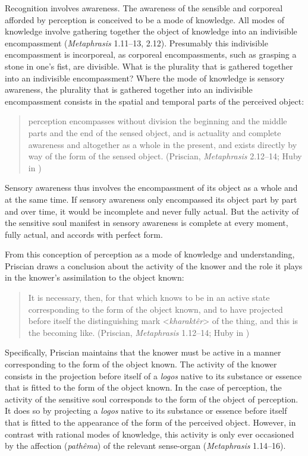 \documentclass[12pt]{article}
\begin{document}
Recognition involves awareness. The awareness of the sensible and corporeal afforded by perception is conceived to be a mode of knowledge. All modes of knowledge involve gathering together the object of knowledge into an indivisible encompassment (\emph{Metaphrasis} 1.11--13, 2.12). Presumably this indivisible encompassment is incorporeal, as corporeal encompassments, such as grasping a stone in one's fist, are divisible. What is the plurality that is gathered together into an indivisible encompassment? Where the mode of knowledge is sensory awareness, the plurality that is gathered together into an indivisible encompassment consists in the spatial and temporal parts of the perceived object:
\begin{quote}
	perception encompasses without division the beginning and the middle parts and the end of the sensed object, and is actuality and complete awareness and altogether as a whole in the present, and exists directly by way of the form of the sensed object. (Priscian, \emph{Metaphrasis} 2.12--14; Huby in \citealt{Sorabji:1997ly})
\end{quote}
Sensory awareness thus involves the encompassment of its object as a whole and at the same time. If sensory awareness only encompassed its object part by part and over time, it would be incomplete and never fully actual. But the activity of the sensitive soul manifest in sensory awareness is complete at every moment, fully actual, and accords with perfect form.

From this conception of perception as a mode of knowledge and understanding, Priscian draws a conclusion about the activity of the knower and the role it plays in the knower's assimilation to the object known: 
\begin{quote}
	It is necessary, then, for that which knows to be in an active state corresponding to the form of the object known, and to have projected before itself the distinguishing mark <\emph{kharaktêr}> of the thing, and this is the becoming like. (Priscian, \emph{Metaphrasis} 1.12--14; Huby in \citealt[9]{Sorabji:1997ly})
\end{quote}
Specifically, Priscian maintains that the knower must be active in a manner corresponding to the form of the object known. The activity of the knower consists in the projection before itself of a \emph{logos} native to its substance or essence that is fitted to the form of the object known. In the case of perception, the activity of the sensitive soul corresponds to the form of the object of perception. It does so by projecting a \emph{logos} native to its substance or essence before itself that is fitted to the appearance of the form of the perceived object. However, in contrast with rational modes of knowledge, this activity is only ever occasioned by the affection (\emph{pathêma}) of the relevant sense-organ (\emph{Metaphrasis} 1.14--16).
\end{document}
